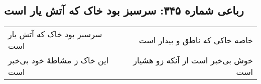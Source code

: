 \begin{center}
\section*{رباعی شماره ۳۴۵: سرسبز بود خاک که آتش یار است}
\label{sec:0345}
\begin{longtable}{l p{0.5cm} r}
سرسبز بود خاک که آتش یار است
&&
خاصه خاکی که ناطق و بیدار است
\\
این خاک ز مشاطهٔ خود بی‌خبر است
&&
خوش بی‌خبر است از آنکه زو هشیار است
\\
\end{longtable}
\end{center}
